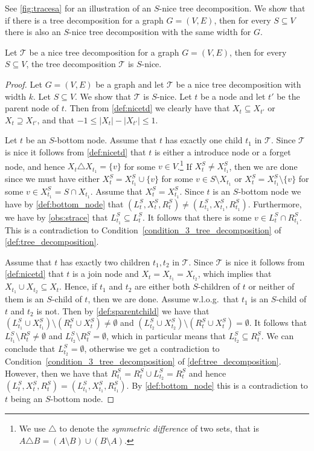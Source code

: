 \documentclass[a4paper,UKenglish,cleveref, autoref, thm-restate, numberwithinsect]{lipics-v2021}
\begin{document}
See \cref{fig:tracesa} for an illustration of an $S$-nice tree decomposition. We show that if there is a tree decomposition for a graph $G=(V,E)$, then for every $S\subseteq V$ there is also an $S$-nice tree decomposition with the same width for $G$.

\begin{lemma}\label{lem:snicetd}
    Let $\mathcal{T}$ be a nice tree decomposition for a graph $G=(V,E)$, then for every $S\subseteq V$, the tree decomposition $\mathcal{T}$ is $S$-nice.
\end{lemma}
\begin{proof}
    Let $G=(V,E)$ be a graph and let $\mathcal{T}$ be a nice tree decomposition with width $k$. 
    Let $S\subseteq V$. We show that $\mathcal{T}$ is $S$-nice.
Let $t$ be a node and let $t'$ be the parent node of $t$.      
     Then from \cref{def:nicetd} we clearly have that $X_t\subseteq X_{t'}$ or $X_t\supseteq X_{t'}$, and that $-1\le |X_t|-|X_{t'}|\le 1$. 

    Let $t$ be an $S$-bottom node. Assume that $t$ has exactly one child $t_1$ in $\mathcal{T}$.
Since $\mathcal{T}$ is nice it follows from \cref{def:nicetd} that $t$ is either a introduce node or a forget node, and hence $X_t\triangle X_{t_1}=\{v\}$ for some $v\in V$.\footnote{We use $\triangle$ to denote the \emph{symmetric difference} of two sets, that is $A\triangle B=(A\setminus B)\cup (B\setminus A)$.}
    If $X_t^S\neq X_{t_1}^S$, then we are done since we must have either $X^S_t=X^S_{t_1}\cup \{v\}$ for some $v\in S\setminus X_{t_1}$ or $X^S_t=X^S_{t_1}\setminus \{v\}$ for some $v\in X^S_{t_1}=S\cap X_{t_1}$. 
Assume that $X_t^S= X_{t_1}^S$. Since $t$ is an $S$-bottom node we have by \cref{def:bottom_node} that $(L_t^S, X_t^S, R_t^S)\neq (L_{t_1}^S, X_{t_1}^S, R_{t_1}^S)$. Furthermore, we have by \cref{obs:strace} that $L_{t_1}^S\subseteq L_t^S$. It follows that there is some $v\in L_t^S\cap R_{t_1}^S$. This is a contradiction to Condition~\ref{condition_3_tree_decomposition} of \cref{def:tree_decomposition}.
    
    Assume that $t$ has exactly two children $t_1,t_2$ in $\mathcal{T}$. 
Since $\mathcal{T}$ is nice it follows from \cref{def:nicetd} that $t$ is a join node and $X_t=X_{t_1}=X_{t_2}$, which implies that $X_{t_1}\cup X_{t_2}\subseteq X_t$.
    Hence, if $t_1$ and $t_2$ are either both $S$-children of $t$ or neither of them is an $S$-child of $t$, then we are done. Assume w.l.o.g.\ that $t_1$ is an $S$-child of $t$ and $t_2$ is not. Then by \cref{def:sparentchild} we have that $(L_{t_1}^S \cup X_{t_1}^S)\setminus (R_t^S \cup X_t^S) \neq \emptyset$ and $(L_{t_2}^S \cup X_{t_2}^S)\setminus (R_t^S \cup X_t^S) = \emptyset$. It follows that $L_{t_1}^S \setminus R_t^S \neq \emptyset$ and $L_{t_2}^S \setminus R_t^S = \emptyset$, which in particular means that $L_{t_2}^S \subseteq R_t^S$. We can conclude that $L_{t_2}^S =\emptyset$, otherwise we get a contradiction to Condition~\ref{condition_3_tree_decomposition} of \cref{def:tree_decomposition}. However, then we have that $R_{t_1}^S=R_t^S\cup L_{t_2}^S=R_t^S$ and hence $(L_{t}^S, X_{t}^S, R_{t}^S)=(L_{t_1}^S, X_{t_1}^S, R_{t_1}^S)$. By \cref{def:bottom_node} this is a contradiction to $t$ being an $S$-bottom node.
\end{proof}
\end{document}
